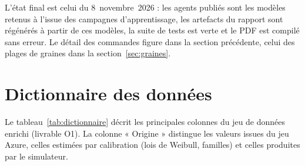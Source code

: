 \documentclass[11pt,a4paper,oneside]{report}
\begin{document}
L'état final est celui du 8~novembre~2026 : les agents publiés sont les modèles retenus à l'issue
des campagnes d'apprentissage, les artefacts du rapport sont régénérés à partir de ces modèles, la
suite de tests est verte et le PDF est compilé sans erreur.
Le détail des commandes figure dans la section précédente, celui des
plages de graines dans la section~\ref{sec:graines}.

\chapter{Dictionnaire des données}\label{sec:dictionnaire-annexe}

Le tableau~\ref{tab:dictionnaire} décrit les principales colonnes du jeu de données enrichi (livrable O1). La colonne « Origine » distingue les valeurs issues du jeu Azure, celles estimées par calibration (lois de Weibull, familles) et celles produites par le simulateur.
\end{document}
